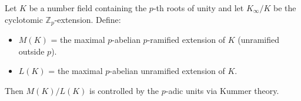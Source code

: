 Let $K$ be a number field containing the $p$-th roots of unity and let $K_{\infty}/K$ be the cyclotomic $\mathbb{Z}_p$-extension. Define:
\begin{itemize}
\item $M(K)$ = the maximal $p$-abelian $p$-ramified extension of $K$ (unramified outside $p$).
\item $L(K)$ = the maximal $p$-abelian unramified extension of $K$.
\end{itemize}
Then $M(K)/L(K)$ is controlled by the $p$-adic units via Kummer theory.
